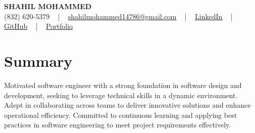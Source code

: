 \documentclass[letterpaper,10pt]{article}
\begin{document}
\begin{center}
    {\fontsize{14pt}{12pt}\selectfont \textbf{\MakeUppercase{Shahil Mohammed}}}\\ \vspace{2pt}
    \fontsize{10pt}{12pt}\selectfont (832) 620-5379 ~ | ~ \href{mailto:shahilmohammed14786@gmail.com}{shahilmohammed14786@gmail.com} ~ | ~  
    \href{https://www.linkedin.com/in/shahil-mohammed-9652931a1/}{\color{blue}\underline{LinkedIn}}  ~ | ~ 
    \href{https://github.com/freakbeast14}{\color{blue}\underline{GitHub}} ~ | ~ 
    \href{https://shahil-mohammed.netlify.app/}{\color{blue}\underline{Portfolio}}
    \vspace{-8pt}
\end{center}

\section{Summary}
\vspace{-2pt}\fontsize{8pt}{9pt}\selectfont
Motivated software engineer with a strong foundation in software design and development, seeking to leverage technical skills in a dynamic environment. Adept in collaborating across teams to deliver innovative solutions and enhance operational efficiency. Committed to continuous learning and applying best practices in software engineering to meet project requirements effectively. 
 \vspace{-5pt}
 
\vspace{-2pt}
\end{document}
